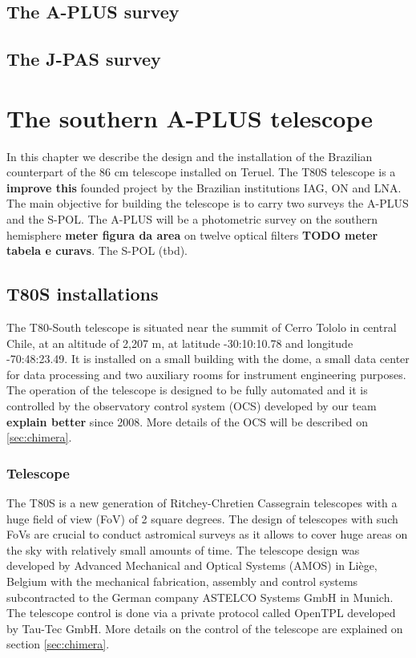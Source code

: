\documentclass[9pt]{memoir}
\begin{document}
\section{The A-PLUS survey}

\section{The J-PAS survey}

\chapter{The southern A-PLUS telescope}

In this chapter we describe the design and the installation of the Brazilian counterpart of the 86 cm telescope installed on Teruel. The T80S telescope is a \textbf{ improve this} founded project by the Brazilian institutions IAG, ON and LNA. The main objective for building the telescope is to carry two surveys the A-PLUS and the S-POL. The A-PLUS will be a photometric survey on the southern hemisphere \textbf{ meter figura da area} on twelve optical filters \textbf{ TODO meter tabela e curavs}. The S-POL (tbd).

\section{T80S installations}
The T80-South telescope is situated near the summit of Cerro Tololo in central Chile, at an altitude of 2,207 m, at latitude -30:10:10.78 and longitude -70:48:23.49. It is installed on a small building with the dome, a small data center for data processing and two auxiliary rooms for instrument engineering purposes. The operation of the telescope is designed to be fully automated and it is controlled by the observatory control system (OCS) developed by our team \textbf{explain better} since 2008. More details of the OCS will be described on \ref{sec:chimera}.

\subsection{Telescope}

The T80S is a new generation of Ritchey-Chretien Cassegrain telescopes with a huge field of view (FoV) of 2 square degrees. The design of telescopes with such FoVs are crucial to conduct astromical surveys as it allows to cover huge areas on the sky with relatively small amounts of time. The telescope design was developed by Advanced Mechanical and Optical Systems (AMOS) in Liège, Belgium with the mechanical fabrication, assembly and control systems subcontracted to the German company ASTELCO Systems GmbH in Munich. The telescope control is done via a private protocol called OpenTPL developed by Tau-Tec GmbH. More details on the control of the telescope are explained on section \ref{sec:chimera}.
\end{document}
